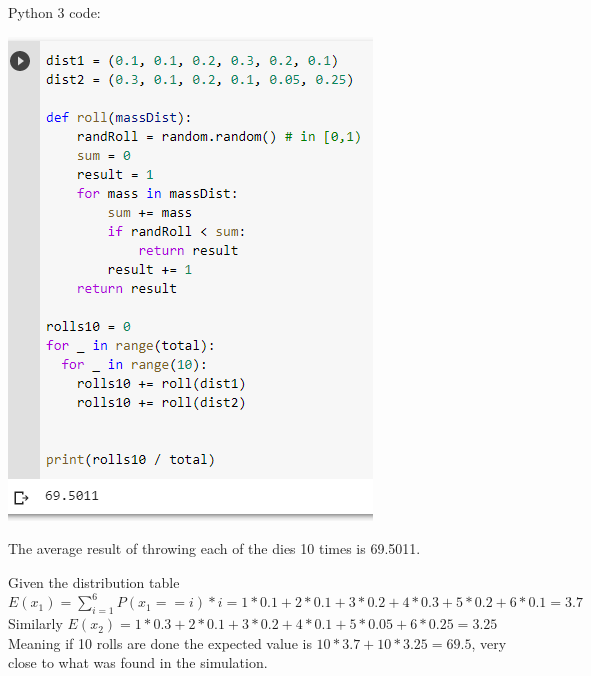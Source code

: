\documentclass{article}
\begin{document}
\begin{enumerate}[1.]
Python 3 code: \\
\begin{center}
\includegraphics{a3_q4}
\end{center}

The average result of throwing each of the dies 10 times is 69.5011. 

Given the distribution table $E(x_1) = \sum_{i = 1}^{6}{P(x_1 == i) * i} = 1 * 0.1 + 2 * 0.1 + 3 * 0.2 + 4 * 0.3 + 5 * 0.2 + 6 * 0.1 = 3.7$ \\
Similarly $E(x_2) = 1 * 0.3 + 2 * 0.1 + 3 * 0.2 + 4 * 0.1 + 5 * 0.05 + 6 * 0.25 = 3.25$ \\
Meaning if 10 rolls are done the expected value is $10 * 3.7 + 10 * 3.25 = 69.5$, very close to what was found in the simulation. 

\end{enumerate}
\end{document}
